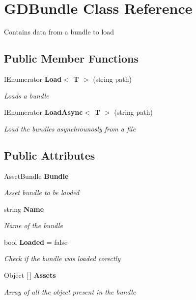 \section{G\+D\+Bundle Class Reference}
\label{class_g_d_bundle}


Contains data from a bundle to load  


\subsection*{Public Member Functions}
\begin{DoxyCompactItemize}
\item 
I\+Enumerator \textbf{ Load$<$ T $>$} (string path)
\begin{DoxyCompactList}\small\item\em Loads a bundle \end{DoxyCompactList}\item 
I\+Enumerator \textbf{ Load\+Async$<$ T $>$} (string path)
\begin{DoxyCompactList}\small\item\em Load the bundles asynchrounosly from a file \end{DoxyCompactList}\end{DoxyCompactItemize}
\subsection*{Public Attributes}
\begin{DoxyCompactItemize}
\item 
Asset\+Bundle \textbf{ Bundle}
\begin{DoxyCompactList}\small\item\em Asset bundle to be laoded \end{DoxyCompactList}\item 
string \textbf{ Name}
\begin{DoxyCompactList}\small\item\em Name of the bundle \end{DoxyCompactList}\item 
bool \textbf{ Loaded} = false
\begin{DoxyCompactList}\small\item\em Check if the bundle was loaded corectly \end{DoxyCompactList}\item 
Object [$\,$] \textbf{ Assets}
\begin{DoxyCompactList}\small\item\em Array of all the object present in the bundle \end{DoxyCompactList}\end{DoxyCompactItemize}


